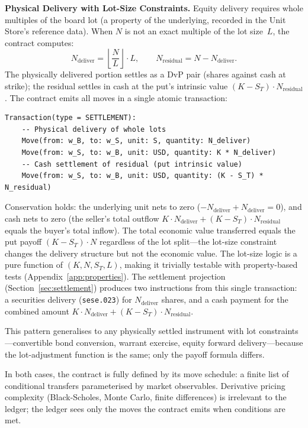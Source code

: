 \documentclass[11pt,a4paper]{article}
\begin{document}
\noindent\textbf{Physical Delivery with Lot-Size Constraints.}
Equity delivery requires whole multiples of the board lot (a property of the underlying, recorded in the Unit Store's reference data). When $N$ is not an exact multiple of the lot size~$L$, the contract computes:
\[
N_{\text{deliver}} = \left\lfloor \frac{N}{L} \right\rfloor \cdot L, \qquad N_{\text{residual}} = N - N_{\text{deliver}}.
\]
The physically delivered portion settles as a DvP pair (shares against cash at strike); the residual settles in cash at the put's intrinsic value $(K - S_T) \cdot N_{\text{residual}}$. The contract emits all moves in a single atomic transaction:

\begin{lstlisting}
Transaction(type = SETTLEMENT):
    -- Physical delivery of whole lots
    Move(from: w_B, to: w_S, unit: S, quantity: N_deliver)
    Move(from: w_S, to: w_B, unit: USD, quantity: K * N_deliver)
    -- Cash settlement of residual (put intrinsic value)
    Move(from: w_S, to: w_B, unit: USD, quantity: (K - S_T) * N_residual)
\end{lstlisting}

\noindent Conservation holds: the underlying unit nets to zero ($-N_{\text{deliver}} + N_{\text{deliver}} = 0$), and cash nets to zero (the seller's total outflow $K \cdot N_{\text{deliver}} + (K - S_T) \cdot N_{\text{residual}}$ equals the buyer's total inflow). The total economic value transferred equals the put payoff $(K - S_T) \cdot N$ regardless of the lot split---the lot-size constraint changes the delivery structure but not the economic value. The lot-size logic is a pure function of $(K, N, S_T, L)$, making it trivially testable with property-based tests (Appendix~\ref{app:properties}). The settlement projection (Section~\ref{sec:settlement}) produces two instructions from this single transaction: a securities delivery (\texttt{sese.023}) for $N_{\text{deliver}}$ shares, and a cash payment for the combined amount $K \cdot N_{\text{deliver}} + (K - S_T) \cdot N_{\text{residual}}$.

This pattern generalises to any physically settled instrument with lot constraints---convertible bond conversion, warrant exercise, equity forward delivery---because the lot-adjustment function is the same; only the payoff formula differs.

\medskip

\noindent In both cases, the contract is fully defined by its move schedule: a finite list of conditional transfers parameterised by market observables. Derivative pricing complexity (Black-Scholes, Monte Carlo, finite differences) is irrelevant to the ledger; the ledger sees only the moves the contract emits when conditions are met.
\end{document}
